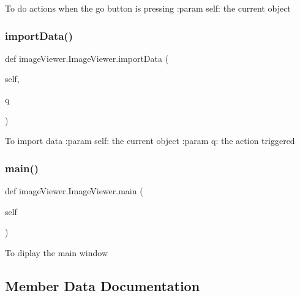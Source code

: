 \begin{DoxyVerb}    To do actions when the go button is pressing
    :param self: the current object
\end{DoxyVerb}
 \mbox{\label{classimage_viewer_1_1_image_viewer_a42d9f543446b850d0e5eefc638c8e031}} 
\subsubsection{\texorpdfstring{import\+Data()}{importData()}}
{\footnotesize\ttfamily def image\+Viewer.\+Image\+Viewer.\+import\+Data (\begin{DoxyParamCaption}\item[{}]{self,  }\item[{}]{q }\end{DoxyParamCaption})}

\begin{DoxyVerb}    To import data
    :param self: the current object
    :param q: the action triggered
\end{DoxyVerb}
 \mbox{\label{classimage_viewer_1_1_image_viewer_ab5f9d4ae528bd32e14fae6cf9673d467}} 
\subsubsection{\texorpdfstring{main()}{main()}}
{\footnotesize\ttfamily def image\+Viewer.\+Image\+Viewer.\+main (\begin{DoxyParamCaption}\item[{}]{self }\end{DoxyParamCaption})}

\begin{DoxyVerb}    To diplay the main window
\end{DoxyVerb}
 

\subsection{Member Data Documentation}
\mbox{\label{classimage_viewer_1_1_image_viewer_a419a3fb29273b2b3c9d6e81539947c36}} 
